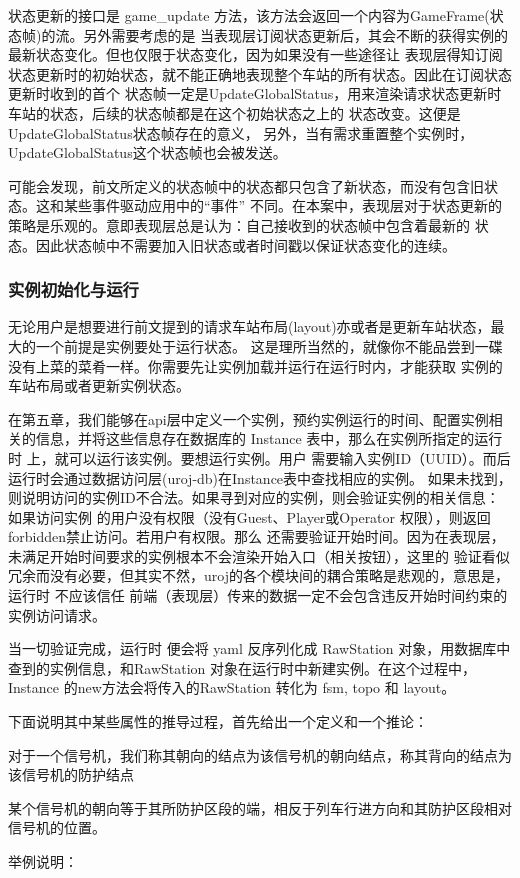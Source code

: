 状态更新的接口是 game\_update 方法，该方法会返回一个内容为GameFrame(状态帧)的流。另外需要考虑的是
当表现层订阅状态更新后，其会不断的获得实例的最新状态变化。但也仅限于状态变化，因为如果没有一些途径让
表现层得知订阅状态更新时的初始状态，就不能正确地表现整个车站的所有状态。因此在订阅状态更新时收到的首个
状态帧一定是UpdateGlobalStatus，用来渲染请求状态更新时车站的状态，后续的状态帧都是在这个初始状态之上的
状态改变。这便是UpdateGlobalStatus状态帧存在的意义，
另外，当有需求重置整个实例时，UpdateGlobalStatus这个状态帧也会被发送。

可能会发现，前文所定义的状态帧中的状态都只包含了新状态，而没有包含旧状态。这和某些事件驱动应用中的“事件”
不同。在本案中，表现层对于状态更新的策略是乐观的。意即表现层总是认为：自己接收到的状态帧中包含着最新的
状态。因此状态帧中不需要加入旧状态或者时间戳以保证状态变化的连续。

\subsubsection{实例初始化与运行}
无论用户是想要进行前文提到的请求车站布局(layout)亦或者是更新车站状态，最大的一个前提是实例要处于运行状态。
这是理所当然的，就像你不能品尝到一碟没有上菜的菜肴一样。你需要先让实例加载并运行在运行时内，才能获取
实例的车站布局或者更新实例状态。

在第五章，我们能够在api层中定义一个实例，预约实例运行的时间、配置实例相关的信息，并将这些信息存在数据库的
Instance 表中，那么在实例所指定的运行时 上，就可以运行该实例。要想运行实例。用户
需要输入实例ID（UUID）。而后运行时会通过数据访问层(uroj-db)在Instance表中查找相应的实例。
如果未找到，则说明访问的实例ID不合法。如果寻到对应的实例，则会验证实例的相关信息：如果访问实例
的用户没有权限（没有Guest、Player或Operator 权限），则返回forbidden禁止访问。若用户有权限。那么
还需要验证开始时间。因为在表现层，未满足开始时间要求的实例根本不会渲染开始入口（相关按钮），这里的
验证看似冗余而没有必要，但其实不然，uroj的各个模块间的耦合策略是悲观的，意思是，运行时 不应该信任
前端（表现层）传来的数据一定不会包含违反开始时间约束的实例访问请求。

当一切验证完成，运行时 便会将 yaml 反序列化成 RawStation 对象，用数据库中查到的实例信息，和RawStation
对象在运行时中新建实例。在这个过程中，Instance 的new方法会将传入的RawStation 转化为 fsm, topo 和 layout。

下面说明其中某些属性的推导过程，首先给出一个定义和一个推论：
\begin{definition}
    对于一个信号机，我们称其朝向的结点为该信号机的朝向结点，称其背向的结点为该信号机的防护结点
\end{definition}
\begin{corollary}
    某个信号机的朝向等于其所防护区段的端，相反于列车行进方向和其防护区段相对信号机的位置。
\end{corollary}
举例说明：

